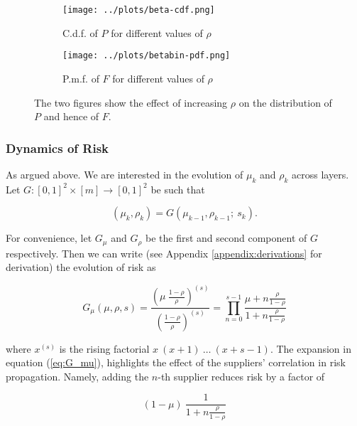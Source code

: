 \documentclass[draft, american, abstract=on]{scrartcl}
\theoremstyle{plain}
\begin{document}
\begin{figure}[H]
  \centering
  \begin{subfigure}{.5\textwidth}
    \centering
    \texttt{[image: ../plots/beta-cdf.png]}
    \caption{C.d.f. of $P$ for different values of $\rho$}
    \label{fig:distribution-illustration:beta}
  \end{subfigure}%
  \begin{subfigure}{.5\textwidth}
    \centering
    \texttt{[image: ../plots/betabin-pdf.png]} 
    \caption{P.m.f. of $F$ for different values of $\rho$}
    \label{fig:distribution-illustration:beta-binomial}
  \end{subfigure}%
  \caption{The two figures show the effect of increasing $\rho$ on the distribution of $P$ and hence of $F$.}
  \label{fig:distribution-illustration}
\end{figure}

\subsubsection{Dynamics of Risk}

As argued above. We are interested in the evolution of $\mu_k$ and $\rho_k$ across layers. Let $G: [0, 1]^2 \times [m] \to [0, 1]^2$ be such that

\begin{equation}
  (\mu_k, \rho_k) = G(\mu_{k - 1}, \rho_{k - 1}; \ s_k).
\end{equation}

For convenience, let $G_{\mu}$ and $G_{\rho}$ be the first and second component of $G$ respectively. Then we can write (see Appendix \ref{appendix:derivations} for derivation) the evolution of risk as

\begin{equation} \label{eq:G_mu}
  G_\mu(\mu, \rho, s) = \frac{\left( \mu \  \frac{1 - \rho}{\rho} \right)^{(s)}}{\left( \frac{1 - \rho}{\rho} \right)^{(s)}} = \prod^{s - 1}_{n = 0} \frac{\mu + n \frac{\rho}{1 - \rho}}{1 + n \frac{\rho}{1 - \rho}}
\end{equation}

where $x^{(s)}$ is the rising factorial $x \ (x + 1) \ \ldots \ (x + s - 1)$. The expansion in equation (\ref{eq:G_mu}), highlights the effect of the suppliers' correlation in risk propagation. Namely, adding the $n$-th supplier reduces risk by a factor of 

\begin{equation}
  (1 - \mu) \ \frac{1}{1 + n \frac{\rho}{1 - \rho}}
\end{equation}
\end{document}
